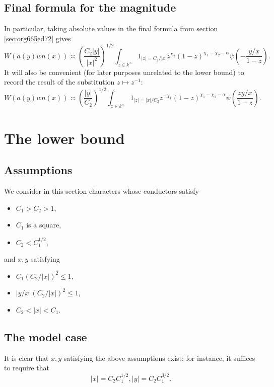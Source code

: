 \documentclass[reqno]{amsart} 
\begin{document}
\subsection{Final formula for the magnitude}
\label{sec:orgcd9e180}
In particular, taking absolute values in the final formula from section \ref{sec:org665ed72} gives
\begin{equation*}
  W(a(y) w n(x)) \asymp \left( \frac{C_2 |y|}{|x|^2} \right)^{1/2} \int_{z \in k^\times} 1_{|z| = C_2/|x|} z^{\chi_2} (1 - z)^{\chi_1 - \chi_2 - \alpha} \psi\left(- \frac{y/x}{1-z} \right).
\end{equation*}
It will also be convenient (for later purposes unrelated to the lower bound) to record the result of the substitution \(z \mapsto z^{-1}\):
\begin{equation*}
  W(a(y) w n(x)) \asymp \left( \frac{|y|}{C_2} \right)^{1/2} \int_{z \in k^\times} 1_{|z| = |x|/C_2} z^{-\chi_1} (1 - z)^{\chi_1 - \chi_2 - \alpha} \psi\left(\frac{z y/x}{1-z} \right).
\end{equation*}
\section{The lower bound}
\label{sec:org5058a58}
\subsection{Assumptions}
\label{sec:org638b8ee}
We consider in this section characters whose conductors satisfy
\begin{itemize}
\item \(C_1 > C_2 > 1\),
\item \(C_1\) is a square,
\item \(C_2 < C_1^{1/2}\),
\end{itemize}
and \(x,y\) satisfying
\begin{itemize}
\item \(C_1 (C_2 / |x|)^2 \leq 1\),
\item \(|y/x| (C_2/ |x|)^2 \leq 1\),
\item \(C_2 < |x| < C_1\).
\end{itemize}
\subsection{The model case}
\label{sec:orgfffc2ef}
It is clear that \(x,y\) satisfying the above assumptions exist; for instance, it suffices to require that
\begin{equation}\label{model-case}
  \lvert x \rvert = C_2 C_1^{1/2},  \lvert y \rvert = C_2 C_1^{3/2}.
\end{equation}
\end{document}
